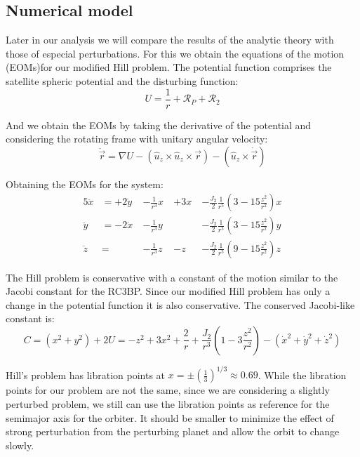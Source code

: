 \subsection{Numerical model}
Later in our analysis we will compare the results of the analytic theory with those of especial perturbations. For this we obtain the equations of the motion (EOMs)for our modified Hill problem. The potential function comprises the satellite spheric potential and the disturbing function:
\begin{equation}
U = \frac{1}{r} + \mathcal{R}_P + \mathcal{R}_2
\end{equation}

And we obtain the EOMs by taking the derivative of the potential and considering the rotating frame with unitary angular velocity:
\begin{equation}
\ddot{\vec{r}} = \nabla U  - \left(\hat{u}_z \times \hat{u}_z \times \vec{r}\right) - \left(\hat{u}_z \times \dot{\vec{r}}\right)
\end{equation}

Obtaining the EOMs for the system:
\begin{alignat}{5}
\label{eomX}
\ddot{x} &= +2 \dot{y} \	&-\frac{1}{r^3} x \	&+ 3x \	&- \frac{J_2 }{2} \frac{1}{r^5} \left(3 - 15 \frac{z^2}{r^2}\right) x\\
\label{eomY}
\ddot{y} &= -2 \dot{x} \	&-\frac{1}{r^3} y \	& 		&- \frac{J_2 }{2} \frac{1}{r^5} \left(3 - 15 \frac{z^2}{r^2}\right) y\\
\label{eomZ}
\ddot{z} &= 				&-\frac{1}{r^3} z \	&- z \	&- \frac{J_2 }{2} \frac{1}{r^5} \left(9 - 15 \frac{z^2}{r^2}\right) z
\end{alignat}

The Hill problem is conservative with a constant of the motion similar to the Jacobi constant for the RC3BP. Since our modified Hill problem has only a change in the potential function it is also conservative. The conserved Jacobi-like constant is:
\begin{equation}
C = (x^2 + y^2) + 2U = -z^2+ 3 x^2 + \frac{2}{r} + \frac{J_2}{r^3} \left(1 - 3 \frac{z^2}{r^2}\right) - (\dot{x}^2 + \dot{y}^2 + \dot{z}^2)
\end{equation}

Hill's problem has libration points at $x= \pm \left(\frac{1}{3}\right)^{1/3} \approx 0.69$. While the libration points for our problem are not the same, since we are considering a slightly perturbed problem, we still can use the libration points as reference for the semimajor axis for the orbiter. It should be smaller to minimize the effect of strong perturbation from the perturbing planet and allow the orbit to change slowly.